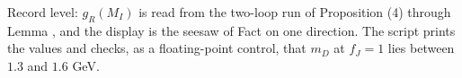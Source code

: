 Record level: $g_{R}(M_{I})$ is read from the two-loop run of Proposition (4) through Lemma , and the display is the seesaw of Fact  on one direction. The script prints the values and checks, as a floating-point control, that $m_{D}$ at $f_{J} = 1$ lies between $1.3$ and $1.6$ GeV.
